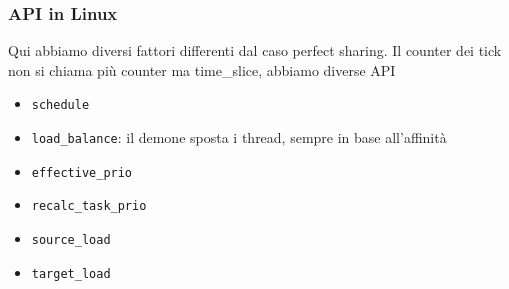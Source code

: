 \documentclass[12pt, oneside]{extbook}
\begin{document}
\subsubsection{API in Linux}
Qui abbiamo diversi fattori differenti dal caso perfect sharing. Il counter dei tick non si chiama più counter ma time\_slice, abbiamo diverse API
\begin{itemize}
\item \texttt{schedule}
\item \texttt{load\_balance}: il demone sposta i thread, sempre in base all'affinità
\item \texttt{effective\_prio}
\item \texttt{recalc\_task\_prio}
\item \texttt{source\_load}
\item \texttt{target\_load}
\end{itemize}
\end{document}
